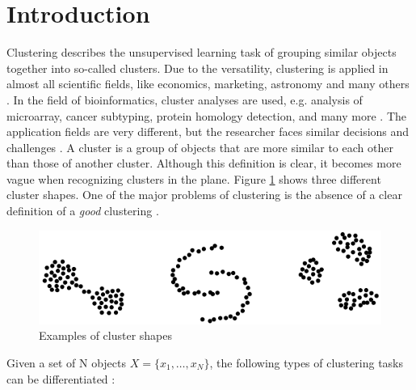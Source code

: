 \documentclass[a4paper,10pt]{article}
\theoremstyle{plain}
\theoremstyle{definition}
\begin{document}
\section{Introduction}
Clustering describes the unsupervised learning task of grouping similar objects together into so-called clusters. Due to the versatility, clustering is applied in almost all scientific fields, like economics, marketing, astronomy and many others \cite{clusteringOverview}. In the field of bioinformatics, cluster analyses are used, e.g. analysis of microarray, cancer subtyping, protein homology detection, and many more \cite{clusteringOverview}. The application fields are very different, but the researcher faces similar decisions and challenges \cite{clusteringOverview}.
A cluster is a group of objects that are more similar to each other than those of another cluster. Although this definition is clear, it becomes more vague when recognizing clusters in the plane. Figure \ref{fig:clusterShapes} shows three different cluster shapes. One of the major problems of clustering is the absence of a clear definition of a \textit{good} clustering \cite{clusteringOverview}.
\begin{figure}
	\centering
	\includegraphics[scale=0.4]{./pictures/clusterShapes.png}
	\caption{Examples of cluster shapes}
	\label{fig:clusterShapes}
\end{figure}
Given a set of N objects $X = \{ x_1, \dots, x_N \}$, the following types of clustering tasks can be differentiated \cite{15overview}:
\end{document}
